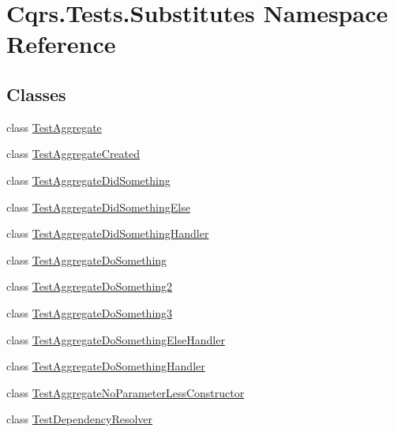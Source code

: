 \hypertarget{namespaceCqrs_1_1Tests_1_1Substitutes}{}\section{Cqrs.\+Tests.\+Substitutes Namespace Reference}
\label{namespaceCqrs_1_1Tests_1_1Substitutes}
\subsection*{Classes}
\begin{DoxyCompactItemize}
\item 
class \hyperlink{classCqrs_1_1Tests_1_1Substitutes_1_1TestAggregate}{Test\+Aggregate}
\item 
class \hyperlink{classCqrs_1_1Tests_1_1Substitutes_1_1TestAggregateCreated}{Test\+Aggregate\+Created}
\item 
class \hyperlink{classCqrs_1_1Tests_1_1Substitutes_1_1TestAggregateDidSomething}{Test\+Aggregate\+Did\+Something}
\item 
class \hyperlink{classCqrs_1_1Tests_1_1Substitutes_1_1TestAggregateDidSomethingElse}{Test\+Aggregate\+Did\+Something\+Else}
\item 
class \hyperlink{classCqrs_1_1Tests_1_1Substitutes_1_1TestAggregateDidSomethingHandler}{Test\+Aggregate\+Did\+Something\+Handler}
\item 
class \hyperlink{classCqrs_1_1Tests_1_1Substitutes_1_1TestAggregateDoSomething}{Test\+Aggregate\+Do\+Something}
\item 
class \hyperlink{classCqrs_1_1Tests_1_1Substitutes_1_1TestAggregateDoSomething2}{Test\+Aggregate\+Do\+Something2}
\item 
class \hyperlink{classCqrs_1_1Tests_1_1Substitutes_1_1TestAggregateDoSomething3}{Test\+Aggregate\+Do\+Something3}
\item 
class \hyperlink{classCqrs_1_1Tests_1_1Substitutes_1_1TestAggregateDoSomethingElseHandler}{Test\+Aggregate\+Do\+Something\+Else\+Handler}
\item 
class \hyperlink{classCqrs_1_1Tests_1_1Substitutes_1_1TestAggregateDoSomethingHandler}{Test\+Aggregate\+Do\+Something\+Handler}
\item 
class \hyperlink{classCqrs_1_1Tests_1_1Substitutes_1_1TestAggregateNoParameterLessConstructor}{Test\+Aggregate\+No\+Parameter\+Less\+Constructor}
\item 
class \hyperlink{classCqrs_1_1Tests_1_1Substitutes_1_1TestDependencyResolver}{Test\+Dependency\+Resolver}

\end{DoxyCompactItemize}
